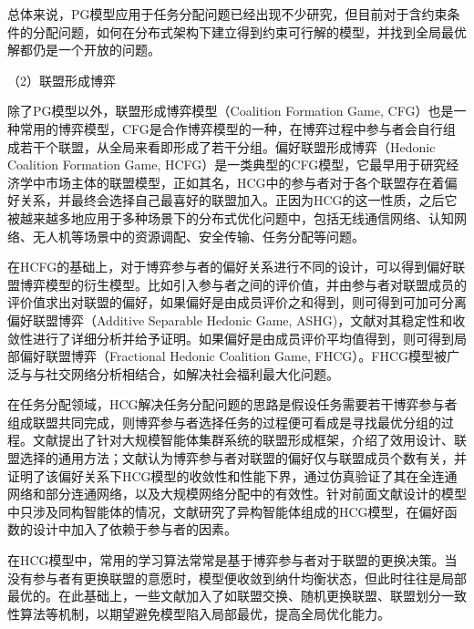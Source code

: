 总体来说，PG模型应用于任务分配问题已经出现不少研究，但目前对于含约束条件的分配问题，如何在分布式架构下建立得到约束可行解的模型，并找到全局最优解都仍是一个开放的问题。

（2）联盟形成博弈

除了PG模型以外，联盟形成博弈模型（Coalition Formation Game, CFG）也是一种常用的博弈模型，CFG是合作博弈模型的一种，在博弈过程中参与者会自行组成若干个联盟，从全局来看即形成了若干分组。偏好联盟形成博弈（Hedonic Coalition Formation Game, HCFG）是一类典型的CFG模型\cite{dreze_hedonic_1980}，它最早用于研究经济学中市场主体的联盟模型\cite{bogomolnaia_stability_2002}，正如其名，HCG中的参与者对于各个联盟存在着偏好关系，并最终会选择自己最喜好的联盟加入。正因为HCG的这一性质，之后它被越来越多地应用于多种场景下的分布式优化问题中，包括无线通信网络\cite{weisiwen_2020}、认知网络\cite{saad_hedonic_2010}、无人机\cite{saad_selfish_2009}等场景中的资源调配、安全传输\cite{caoyang_2017}、任务分配\cite{saad_hedonic_2011}等问题。

在HCFG的基础上，对于博弈参与者的偏好关系进行不同的设计，可以得到偏好联盟博弈模型的衍生模型。比如引入参与者之间的评价值，并由参与者对联盟成员的评价值求出对联盟的偏好，如果偏好是由成员评价之和得到，则可得到可加可分离偏好联盟博弈（Additive Separable Hedonic Game, ASHG)，文献\parencite{Aziz_2015}对其稳定性和收敛性进行了详细分析并给予证明。如果偏好是由成员评价平均值得到，则可得到局部偏好联盟博弈\cite{aziz_hedonic_2019}（Fractional Hedonic Coalition Game, FHCG）。FHCG模型被广泛与与社交网络分析相结合，如解决社会福利最大化问题\cite{aziz_2015,chen_2019}。

在任务分配领域，HCG解决任务分配问题的思路是假设任务需要若干博弈参与者组成联盟共同完成，则博弈参与者选择任务的过程便可看成是寻找最优分组的过程。文献\parencite{janovsky_multi-agent_2016}提出了针对大规模智能体集群系统的联盟形成框架，介绍了效用设计、联盟选择的通用方法；文献\parencite{jang_anonymous_2018}认为博弈参与者对联盟的偏好仅与联盟成员个数有关，并证明了该偏好关系下HCG模型的收敛性和性能下界，通过仿真验证了其在全连通网络和部分连通网络，以及大规模网络分配中的有效性。针对前面文献设计的模型中只涉及同构智能体的情况，文献\parencite{czatnecki_hedonic_2019}研究了异构智能体组成的HCG模型，在偏好函数的设计中加入了依赖于参与者的因素。

在HCG模型中，常用的学习算法常常是基于博弈参与者对于联盟的更换决策。当没有参与者有更换联盟的意愿时，模型便收敛到纳什均衡状态，但此时往往是局部最优的。在此基础上，一些文献加入了如联盟交换\cite{saad_hedonic_2010}、随机更换联盟、联盟划分一致性算法\cite{jang_anonymous_2018}等机制，以期望避免模型陷入局部最优，提高全局优化能力。

